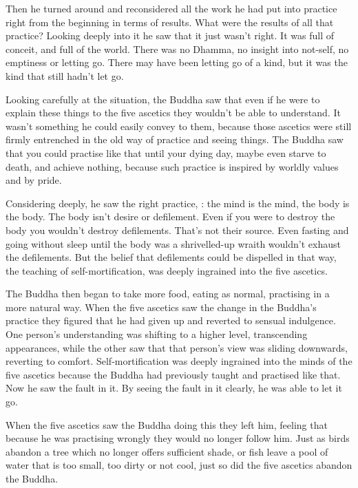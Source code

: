 Then he turned around and reconsidered all the work he had put into practice right from the beginning in terms of results. What were the results of all that practice? Looking deeply into it he saw that it just wasn't right. It was full of conceit, and full of the world. There was no Dhamma, no insight into not-self,  no emptiness or letting go. There may have been letting go of a kind, but it was the kind that still hadn't let go.

Looking carefully at the situation, the Buddha saw that even if he were to explain these things to the five ascetics they wouldn't be able to understand. It wasn't something he could easily convey to them, because those ascetics were still firmly entrenched in the old way of practice and seeing things. The Buddha saw that you could practise like that until your dying day, maybe even starve to death, and achieve nothing, because such practice is inspired by worldly values and by pride.

Considering deeply, he saw the right practice, : the mind is the mind, the body is the body. The body isn't desire or defilement. Even if you were to destroy the body you wouldn't destroy defilements. That's not their source. Even fasting and going without sleep until the body was a shrivelled-up wraith wouldn't exhaust the defilements. But the belief that defilements could be dispelled in that way, the teaching of self-mortification, was deeply ingrained into the five ascetics.

The Buddha then began to take more food, eating as normal, practising in a more natural way. When the five ascetics saw the change in the Buddha's practice they figured that he had given up and reverted to sensual indulgence. One person's understanding was shifting to a higher level, transcending appearances, while the other saw that that person's view was sliding downwards, reverting to comfort. Self-mortification was deeply ingrained into the minds of the five ascetics because the Buddha had previously taught and practised like that. Now he saw the fault in it. By seeing the fault in it clearly, he was able to let it go.

When the five ascetics saw the Buddha doing this they left him, feeling that because he was practising wrongly they would no longer follow him. Just as birds abandon a tree which no longer offers sufficient shade, or fish leave a pool of water that is too small, too dirty or not cool, just so did the five ascetics abandon the Buddha.

